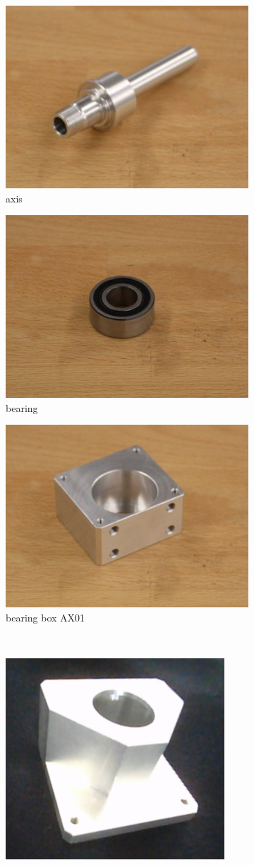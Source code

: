 \begin{figure}[!htb]
\centering
\begin{subfigure}{.3\textwidth}
  \centering
  \includegraphics[width=.5\linewidth]{images/axis}
  \caption{axis \cite{github_robocup@work}}
  \label{fig:axis}
\end{subfigure}%
\begin{subfigure}{.3\textwidth}
  \centering
  \includegraphics[width=.5\linewidth]{images/bearing}
  \caption{bearing \cite{github_robocup@work}}
  \label{fig:bearing}
\end{subfigure}
\begin{subfigure}{.3\textwidth}
  \centering
  \includegraphics[width=.5\linewidth]{images/bearingBoxAX01}
  \caption{bearing box AX01 \cite{github_robocup@work}}
  \label{fig:bearingBoxAX01}
\end{subfigure}\\
\vspace{3mm}
\begin{subfigure}{.3\textwidth}
  \centering
  \includegraphics[width=.5\linewidth]{images/bearingBoxAX16}

\end{subfigure}
\end{figure}
